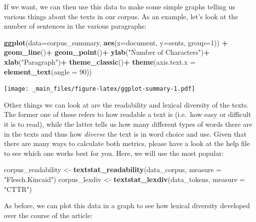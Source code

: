 \documentclass[
]{book}
\newenvironment{Shaded}{\begin{snugshade}}{\end{snugshade}}
\newcommand{\AttributeTok}[1]{\textcolor[rgb]{0.13,0.29,0.53}{#1}}
\newcommand{\DecValTok}[1]{\textcolor[rgb]{0.00,0.00,0.81}{#1}}
\newcommand{\FunctionTok}[1]{\textcolor[rgb]{0.13,0.29,0.53}{\textbf{#1}}}
\newcommand{\NormalTok}[1]{#1}
\newcommand{\OtherTok}[1]{\textcolor[rgb]{0.56,0.35,0.01}{#1}}
\newcommand{\SpecialCharTok}[1]{\textcolor[rgb]{0.81,0.36,0.00}{\textbf{#1}}}
\newcommand{\StringTok}[1]{\textcolor[rgb]{0.31,0.60,0.02}{#1}}
\begin{document}
If we want, we can then use this data to make some simple graphs telling us various things about the texts in our corpus. As an example, let's look at the number of sentences in the various paragraphs:

\begin{Shaded}
\begin{Highlighting}[]
\FunctionTok{ggplot}\NormalTok{(}\AttributeTok{data=}\NormalTok{corpus\_summary, }\FunctionTok{aes}\NormalTok{(}\AttributeTok{x=}\NormalTok{document, }\AttributeTok{y=}\NormalTok{sents, }\AttributeTok{group=}\DecValTok{1}\NormalTok{)) }\SpecialCharTok{+}
 \FunctionTok{geom\_line}\NormalTok{()}\SpecialCharTok{+}
 \FunctionTok{geom\_point}\NormalTok{()}\SpecialCharTok{+}
 \FunctionTok{ylab}\NormalTok{(}\StringTok{"Number of Characters"}\NormalTok{)}\SpecialCharTok{+}
 \FunctionTok{xlab}\NormalTok{(}\StringTok{"Paragraph"}\NormalTok{)}\SpecialCharTok{+}
 \FunctionTok{theme\_classic}\NormalTok{()}\SpecialCharTok{+}
 \FunctionTok{theme}\NormalTok{(}\AttributeTok{axis.text.x =} \FunctionTok{element\_text}\NormalTok{(}\AttributeTok{angle =} \DecValTok{90}\NormalTok{))}
\end{Highlighting}
\end{Shaded}

\texttt{[image: \_main\_files/figure-latex/ggplot-summary-1.pdf]}

Other things we can look at are the readability and lexical diversity of the texts. The former one of these refers to how readable a text is (i.e.~how easy or difficult it is to read), while the latter tells us how many different types of words there are in the texts and thus how \emph{diverse} the text is in word choice and use. Given that there are many ways to calculate both metrics, please have a look at the help file to see which one works best for you. Here, we will use the most popular:

\begin{Shaded}
\begin{Highlighting}[]
\NormalTok{corpus\_readability }\OtherTok{\textless{}{-}} \FunctionTok{textstat\_readability}\NormalTok{(data\_corpus, }\AttributeTok{measure =} \StringTok{"Flesch.Kincaid"}\NormalTok{)}
\NormalTok{corpus\_lexdiv }\OtherTok{\textless{}{-}} \FunctionTok{textstat\_lexdiv}\NormalTok{(data\_tokens, }\AttributeTok{measure =} \StringTok{"CTTR"}\NormalTok{)}
\end{Highlighting}
\end{Shaded}

As before, we can plot this data in a graph to see how lexical diversity developed over the course of the article:
\end{document}
